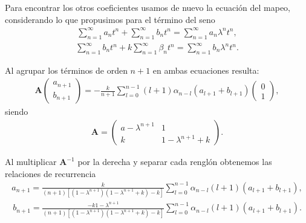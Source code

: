 \documentclass[11pt]{beamer}
\theoremstyle{definition}
\begin{document}
\begin{frame}
Para encontrar los otros coeficientes usamos de nuevo la ecuaci\'on del mapeo, considerando lo que propusimos para el t\'ermino del seno
\begin{eqnarray}
\sum_{n=1}^{\infty}a_{n}t^{n}+\sum_{n=1}^{\infty}b_{n}t^{n}=\sum_{n=1}^{\infty}a_{n}\lambda^{n}t^{n},
\end{eqnarray}
\begin{eqnarray}
\sum_{n=1}^{\infty}b_{n}t^{n}+k\sum_{n=1}^{\infty}\beta_{n}t^{n}=\sum_{n=1}^{\infty}b_{n}
\lambda^{n}t^{n}.
\end{eqnarray}
\end{frame}
\begin{frame}
Al agrupar los t\'erminos de orden $n+1$ en ambas ecuaciones resulta:
\begin{eqnarray}
\mathbf{A}\begin{pmatrix}
a_{n+1}\\
b_{n+1}
\end{pmatrix}=-\frac{k}{n+1}\sum_{l=0}^{n-1}(l+1)\alpha_{n-l}(a_{l+1}+b_{l+1})\begin{pmatrix}
0\\
1
\end{pmatrix},
\label{sistema recurrencia}
\end{eqnarray}
siendo 
\begin{eqnarray}
\mathbf{A}=\begin{pmatrix}
a-\lambda^{n+1} & 1 \\
k & 1-\lambda^{n+1}+k
\end{pmatrix}.
\end{eqnarray}
\end{frame}
\begin{frame}Al multiplicar $\mathbf{A}^{-1}$ por la derecha y separar cada rengl\'on obtenemos las relaciones de recurrencia
\begin{eqnarray}
a_{n+1}=\frac{k}{(n+1)[(1-\lambda^{n+1})(1-\lambda^{n+1}+k)-k]}\sum_{l=0}^{n-1}\alpha_{n-l}(l+1)(a_{l+1}+b_{l+1}),
\end{eqnarray}
\begin{eqnarray}
b_{n+1}=\frac{-k 1-\lambda^{n+1}}{(n+1)[(1-\lambda^{n+1})(1-\lambda^{n+1}+k)-k]}\sum_{l=0}^{n-1}\alpha_{n-l}(l+1)(a_{l+1}+b_{l+1}).
\end{eqnarray}
\end{frame}
\end{document}
